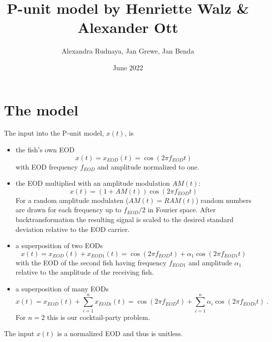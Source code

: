 \documentclass[12pt,a4paper]{article}
\title{P-unit model by Henriette Walz \& Alexander Ott}
\author{Alexandra Rudnaya, Jan Grewe, Jan Benda}
\date{June 2022}
\begin{document}
\maketitle


\section{The model}

The input into the P-unit model, $x(t)$, is
\begin{itemize}
\item the fish's own EOD
  \begin{equation}
    \label{eod}
    x(t) = x_{EOD}(t) = \cos(2\pi f_{EOD} t)
  \end{equation}
  with EOD frequency $f_{EOD}$ and amplitude normalized to one.
\item the EOD multiplied with an amplitude modulation $AM(t)$:
  \begin{equation}
    \label{am}
    x(t) = (1+AM(t)) \cos(2\pi f_{EOD} t)
  \end{equation}
  For a random amplitude modulaten ($AM(t) = RAM(t)$) random numbers
  are drawn for each frequency up to $f_{EOD}/2$ in Fourier
  space. After backtransformation the resulting signal is scaled to
  the desired standard deviation relative to the EOD carrier.
\item a superposition of two EODs
  \begin{equation}
    \label{beat}
    x(t) = x_{EOD}(t) + x_{EOD1}(t) = \cos(2\pi f_{EOD} t) + \alpha_1 \cos(2\pi f_{EOD1} t)
  \end{equation}
  with the EOD of the second fish having frequency $f_{EOD1}$ and amplitude $\alpha_1$ relative to the amplitude of the receiving fish.
\item a superposition of many EODs
  \begin{equation}
    \label{multibeat}
    x(t) = x_{EOD}(t) + \sum_{i=1}^{n} x_{EODi}(t) = \cos(2\pi f_{EOD} t) + \sum_{i=1}^{n} \alpha_i \cos(2\pi f_{EODi} t) \; .
  \end{equation}
  For $n=2$ this is our cocktail-party problem.  
\end{itemize}
The input $x(t)$ is a normalized EOD and thus is unitless.
\end{document}
